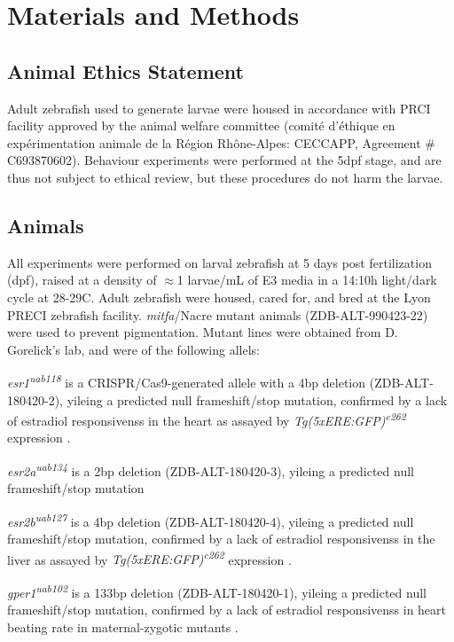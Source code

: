 \documentclass[9pt,lineno]{RandlettLab_elife}
\begin{document}
\section{Materials and Methods}

\subsection{Animal Ethics Statement}

Adult zebrafish used to generate larvae were housed in accordance with PRCI facility approved by the animal welfare committee (comité d’éthique en expérimentation animale de la Région Rhône-Alpes: CECCAPP, Agreement \# C693870602). Behaviour experiments were performed at the 5dpf stage, and are thus not subject to ethical review, but these procedures do not harm the larvae. 

\subsection{Animals}

All experiments were performed on larval zebrafish at 5 days post fertilization (dpf), raised at a density of $\approx$1 larvae/mL of E3 media in a 14:10h light/dark cycle at 28-29\degree{}C. Adult zebrafish were housed, cared for, and bred at the Lyon PRECI zebrafish facility. \textit{mitfa}/Nacre mutant animals (ZDB-ALT-990423-22) were used to prevent pigmentation. Mutant lines were obtained from D. Gorelick's lab, and were of the following allels: 

\emph{esr1\textsuperscript{uab118}} is a CRISPR/Cas9-generated allele with a 4bp deletion (ZDB-ALT-180420-2), yileing a predicted null frameshift/stop mutation, confirmed by a lack of estradiol responsivenss in the heart as assayed by \emph{Tg(5xERE:GFP)\textsuperscript{c262}} expression \citep{Romano2017-ep}. 

\emph{esr2a\textsuperscript{uab134}} is a 2bp deletion (ZDB-ALT-180420-3), yileing a predicted null frameshift/stop mutation \citep{Romano2017-ep}

\emph{esr2b\textsuperscript{uab127}} is a 4bp deletion (ZDB-ALT-180420-4), yileing a predicted null frameshift/stop mutation, confirmed by a lack of estradiol responsivenss in the liver as assayed by \emph{Tg(5xERE:GFP)\textsuperscript{c262}} expression \citep{Romano2017-ep}. 

\emph{gper1\textsuperscript{uab102}} is a 133bp deletion (ZDB-ALT-180420-1), yileing a predicted null frameshift/stop mutation, confirmed by a lack of estradiol responsivenss in heart beating rate in maternal-zygotic mutants \citep{Romano2017-ep}.
\end{document}

